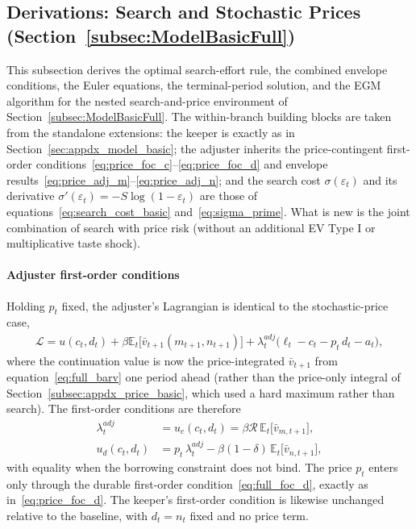 \subsection{Derivations: Search and Stochastic Prices (Section~\ref{subsec:ModelBasicFull})}\label{subsec:appdx_full_basic}

This subsection derives the optimal search-effort rule, the combined envelope conditions, the Euler equations, the terminal-period solution, and the EGM algorithm for the nested search-and-price environment of Section~\ref{subsec:ModelBasicFull}. The within-branch building blocks are taken from the standalone extensions: the keeper is exactly as in Section~\ref{sec:appdx_model_basic}; the adjuster inherits the price-contingent first-order conditions~\eqref{eq:price_foc_c}--\eqref{eq:price_foc_d} and envelope results~\eqref{eq:price_adj_m}--\eqref{eq:price_adj_n}; and the search cost $\sigma(\varepsilon_t)$ and its derivative $\sigma'(\varepsilon_t)=-S\log(1-\varepsilon_t)$ are those of equations~\eqref{eq:search_cost_basic} and~\eqref{eq:sigma_prime}. What is new is the joint combination of search with price risk (without an additional EV Type I or multiplicative taste shock).

\paragraph{Adjuster first-order conditions}
Holding $p_t$ fixed, the adjuster's Lagrangian is identical to the stochastic-price case,
\begin{align}
	\mathscr{L} = u(c_t,d_t) + \beta \mathbb{E}_t\big[\bar v_{t+1}(m_{t+1},n_{t+1})\big] + \lambda_t^{adj}\big(\ell_t - c_t - p_t\, d_t - a_t\big),
\end{align}
where the continuation value is now the price-integrated $\bar v_{t+1}$ from equation~\eqref{eq:full_barv} one period ahead (rather than the price-only integral of Section~\ref{subsec:appdx_price_basic}, which used a hard maximum rather than search). The first-order conditions are therefore
\begin{align}
	\lambda_t^{adj} &= u_c(c_t,d_t) = \beta \mathcal{R}\, \mathbb{E}_t\big[\bar v_{m,t+1}\big], \label{eq:full_foc_c}\\
	u_d(c_t,d_t) &= p_t\,\lambda_t^{adj} - \beta(1-\delta)\,\mathbb{E}_t\big[\bar v_{n,t+1}\big], \label{eq:full_foc_d}
\end{align}
with equality when the borrowing constraint does not bind. The price $p_t$ enters only through the durable first-order condition~\eqref{eq:full_foc_d}, exactly as in~\eqref{eq:price_foc_d}. The keeper's first-order condition is likewise unchanged relative to the baseline, with $d_t=n_t$ fixed and no price term.

